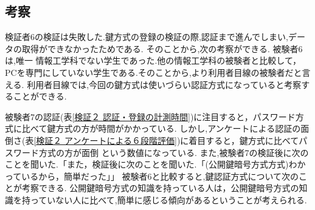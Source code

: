   \subsection{考察}
  検証者6の検証は失敗した.鍵方式の登録の検証の際,認証まで進んでしまい,データの取得ができなかったためである.
  そのことから,次の考察ができる.
    被験者6は,唯一 情報工学科でない学生であった.他の情報工学科の被験者と比較して，
    PCを専門にしていない学生である.そのことから,より利用者目線の被験者だと言える.
    利用者目線では,今回の鍵方式は使いづらい認証方式になっていると考察することができる.

    被験者7の認証(表\ref{検証２ 認証・登録の計測時間})に注目すると，パスワード方式に比べて鍵方式の方が時間がかかっている.
    しかし,アンケートによる認証の面倒さ(表\ref{検証２ アンケートによる６段階評価})に着目すると，鍵方式に比べてパスワード方式の方が面倒 という数値になっている.
    また,被験者7の検証後に次のことを聞いた.「また，検証後に次のことを聞いた.「(公開鍵暗号方式方式)わかっているから，簡単だった」」
    被験者6と比較すると,鍵認証方式について次のことが考察できる.
    公開鍵暗号方式の知識を持っている人は，公開鍵暗号方式の知識を持っていない人に比べて,簡単に感じる傾向があるということが考えられる.
